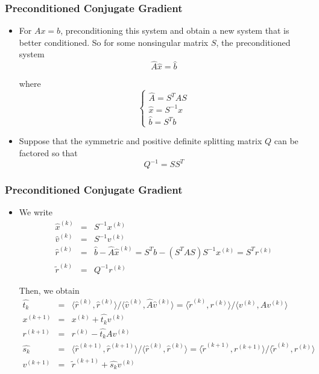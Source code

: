 \documentclass[notheorems,mathserif,table,compress]{beamer}  %
\begin{document}
%
\begin{frame}
\frametitle{Preconditioned Conjugate Gradient}
\begin{itemize}
\item For $Ax=b$, preconditioning this system and obtain a new system that is better conditioned. So for some nonsingular matrix $S$, the preconditioned system
\begin{displaymath}
\widehat{A}\hat{x}=\hat{b}
\end{displaymath}

where
\begin{displaymath}
\left\{\begin{array}{l}
\widehat{A}=S^TAS\\
\hat{x}=S^{-1}x\\
\hat{b}=S^Tb
\end{array} \right.
\end{displaymath} 
 
\item Suppose that the symmetric and positive definite splitting matrix $Q$ can be factored so that 
\begin{displaymath}
Q^{-1}=SS^T
\end{displaymath}

\end{itemize}
\end{frame}

%
\begin{frame}
\frametitle{Preconditioned Conjugate Gradient}
\begin{itemize}
\item We write
\begin{eqnarray*}
\hat{x}^{(k)}&=&S^{-1}x^{(k)}\\
\hat{v}^{(k)}&=&S^{-1}v^{(k)}\\
\hat{r}^{(k)}&=&\hat{b}-\widehat{A}\hat{x}^{(k)}=S^Tb-(S^TAS)S^{-1}x^{(k)}=S^Tr^{(k)}\\
\tilde{r}^{(k)}&=&Q^{-1}r^{(k)}                     
\end{eqnarray*}

Then, we obtain
\begin{eqnarray*}
\hat{t_k}&=&\langle \hat{r}^{(k)},\hat{r}^{(k)}\rangle/\langle \hat{v}^{(k)},\widehat{A}\hat{v}^{(k)}\rangle=\langle \tilde{r}^{(k)},r^{(k)}\rangle/\langle v^{(k)},Av^{(k)}\rangle\\
x^{(k+1)}&=&x^{(k)}+\hat{t_k}v^{(k)}\\
r^{(k+1)}&=&r^{(k)}-\hat{t_k}Av^{(k)}\\
\hat{s_k}&=&\langle \hat{r}^{(k+1)},\hat{r}^{(k+1)}\rangle/\langle \hat{r}^{(k)},\hat{r}^{(k)}\rangle=\langle \tilde{r}^{(k+1)},r^{(k+1)}\rangle/\langle \tilde{r}^{(k)},r^{(k)}\rangle\\
v^{(k+1)}&=&\tilde{r}^{(k+1)}+\hat{s_k}v^{(k)}
\end{eqnarray*}

\end{itemize}
\end{frame}
\end{document}
